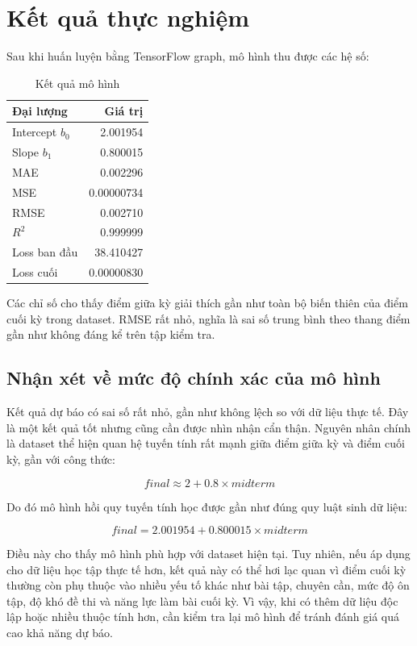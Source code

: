 \documentclass[12pt,a4paper]{article}
\begin{document}
\section{Kết quả thực nghiệm}
Sau khi huấn luyện bằng TensorFlow graph, mô hình thu được các hệ số:

\begin{table}[H]
    \centering
    \caption{Kết quả mô hình}
    \begin{tabular}{lr}
        \toprule
        Đại lượng & Giá trị \\
        \midrule
        Intercept \(b_0\) & 2.001954 \\
        Slope \(b_1\) & 0.800015 \\
        MAE & 0.002296 \\
        MSE & 0.00000734 \\
        RMSE & 0.002710 \\
        \(R^2\) & 0.999999 \\
        Loss ban đầu & 38.410427 \\
        Loss cuối & 0.00000830 \\
        \bottomrule
    \end{tabular}
\end{table}

Các chỉ số cho thấy điểm giữa kỳ giải thích gần như toàn bộ biến thiên của điểm cuối kỳ trong dataset.
RMSE rất nhỏ, nghĩa là sai số trung bình theo thang điểm gần như không đáng kể trên tập kiểm tra.

\subsection{Nhận xét về mức độ chính xác của mô hình}
Kết quả dự báo có sai số rất nhỏ, gần như không lệch so với dữ liệu thực tế. Đây là một kết quả tốt nhưng cũng cần được nhìn nhận cẩn thận.
Nguyên nhân chính là dataset thể hiện quan hệ tuyến tính rất mạnh giữa điểm giữa kỳ và điểm cuối kỳ, gần với công thức:

\[
    final \approx 2 + 0.8 \times midterm
\]

Do đó mô hình hồi quy tuyến tính học được gần như đúng quy luật sinh dữ liệu:

\[
    final = 2.001954 + 0.800015 \times midterm
\]

Điều này cho thấy mô hình phù hợp với dataset hiện tại. Tuy nhiên, nếu áp dụng cho dữ liệu học tập thực tế hơn, kết quả này có thể hơi lạc quan vì điểm cuối kỳ thường còn phụ thuộc vào nhiều yếu tố khác như bài tập, chuyên cần, mức độ ôn tập, độ khó đề thi và năng lực làm bài cuối kỳ. Vì vậy, khi có thêm dữ liệu độc lập hoặc nhiều thuộc tính hơn, cần kiểm tra lại mô hình để tránh đánh giá quá cao khả năng dự báo.
\end{document}
